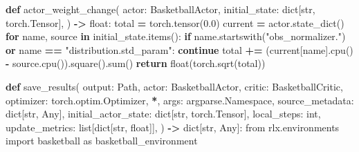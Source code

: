 \documentclass[
  chinese,
  11pt,
  letterpaper,
]{article}
\newenvironment{Shaded}{\begin{snugshade}}{\end{snugshade}}
\newcommand{\BuiltInTok}[1]{#1}
\newcommand{\ControlFlowTok}[1]{\textcolor[rgb]{0.13,0.29,0.53}{\textbf{#1}}}
\newcommand{\FloatTok}[1]{\textcolor[rgb]{0.00,0.00,0.81}{#1}}
\newcommand{\ImportTok}[1]{#1}
\newcommand{\KeywordTok}[1]{\textcolor[rgb]{0.13,0.29,0.53}{\textbf{#1}}}
\newcommand{\NormalTok}[1]{#1}
\newcommand{\OperatorTok}[1]{\textcolor[rgb]{0.81,0.36,0.00}{\textbf{#1}}}
\newcommand{\StringTok}[1]{\textcolor[rgb]{0.31,0.60,0.02}{#1}}
\renewenvironment{Shaded}{\par\smallskip}{\par\smallskip}
\begin{document}
\begin{Shaded}
\begin{Highlighting}[]
\KeywordTok{def}\NormalTok{ actor\_weight\_change(}
\NormalTok{    actor: BasketballActor,}
\NormalTok{    initial\_state: }\BuiltInTok{dict}\NormalTok{[}\BuiltInTok{str}\NormalTok{, torch.Tensor],}
\NormalTok{) }\OperatorTok{{-}\textgreater{}} \BuiltInTok{float}\NormalTok{:}
\NormalTok{    total }\OperatorTok{=}\NormalTok{ torch.tensor(}\FloatTok{0.0}\NormalTok{)}
\NormalTok{    current }\OperatorTok{=}\NormalTok{ actor.state\_dict()}
    \ControlFlowTok{for}\NormalTok{ name, source }\KeywordTok{in}\NormalTok{ initial\_state.items():}
        \ControlFlowTok{if}\NormalTok{ name.startswith(}\StringTok{"obs\_normalizer."}\NormalTok{) }\KeywordTok{or}\NormalTok{ name }\OperatorTok{==} \StringTok{"distribution.std\_param"}\NormalTok{:}
            \ControlFlowTok{continue}
\NormalTok{        total }\OperatorTok{+=}\NormalTok{ (current[name].cpu() }\OperatorTok{{-}}\NormalTok{ source.cpu()).square().}\BuiltInTok{sum}\NormalTok{()}
    \ControlFlowTok{return} \BuiltInTok{float}\NormalTok{(torch.sqrt(total))}


\KeywordTok{def}\NormalTok{ save\_results(}
\NormalTok{    output: Path,}
\NormalTok{    actor: BasketballActor,}
\NormalTok{    critic: BasketballCritic,}
\NormalTok{    optimizer: torch.optim.Optimizer,}
    \OperatorTok{*}\NormalTok{,}
\NormalTok{    args: argparse.Namespace,}
\NormalTok{    source\_metadata: }\BuiltInTok{dict}\NormalTok{[}\BuiltInTok{str}\NormalTok{, Any],}
\NormalTok{    initial\_actor\_state: }\BuiltInTok{dict}\NormalTok{[}\BuiltInTok{str}\NormalTok{, torch.Tensor],}
\NormalTok{    local\_steps: }\BuiltInTok{int}\NormalTok{,}
\NormalTok{    update\_metrics: }\BuiltInTok{list}\NormalTok{[}\BuiltInTok{dict}\NormalTok{[}\BuiltInTok{str}\NormalTok{, }\BuiltInTok{float}\NormalTok{]],}
\NormalTok{) }\OperatorTok{{-}\textgreater{}} \BuiltInTok{dict}\NormalTok{[}\BuiltInTok{str}\NormalTok{, Any]:}
    \ImportTok{from}\NormalTok{ rlx.environments }\ImportTok{import}\NormalTok{ basketball }\ImportTok{as}\NormalTok{ basketball\_environment}


\end{Highlighting}
\end{Shaded}
\end{document}
